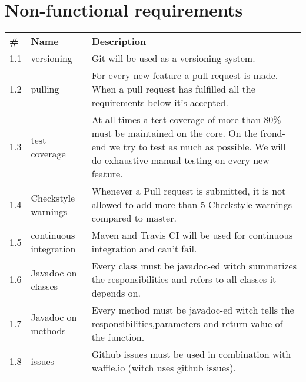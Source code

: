 \documentclass{scrreprt}
\begin{document}
\chapter*{Non-functional requirements}

\begin{table}[h]
\begin{tabular}{|p{0.5cm}|p{3.5cm}|p{14cm}|}
\textbf{\#} & \textbf{Name} & \textbf{Description} \\
	  1.1 & versioning & Git will be used as a versioning system.\\
	  1.2 & pulling & For every new feature a pull request is made. When a pull request has fulfilled all the requirements below it's accepted.      \\
      1.3 & test coverage & At all times a test coverage of more than 80\% must be maintained on the core. On the frond-end we try to test as much as possible. We will do exhaustive manual testing on every new feature.\\
      1.4 & Checkstyle warnings & Whenever a Pull request is submitted, it is not allowed to add more than 5 Checkstyle warnings compared to master.\\
      1.5 & continuous integration & Maven and Travis CI will be used for continuous integration and can't fail.\\
      1.6 & Javadoc on classes & Every class must be javadoc-ed witch summarizes the responsibilities and refers to all classes it depends on.\\
      1.7 & Javadoc on methods & Every method must be javadoc-ed witch tells the responsibilities,parameters and return value of the function.\\
      1.8 & issues & Github issues must be used in combination with waffle.io (witch uses github issues).\\
\end{tabular}
\end{table}
\end{document}
